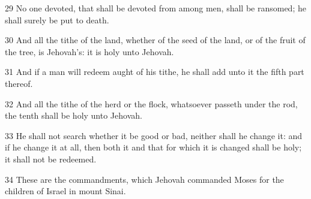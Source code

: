 \par 29 No one devoted, that shall be devoted from among men, shall be ransomed; he shall surely be put to death.
\par 30 And all the tithe of the land, whether of the seed of the land, or of the fruit of the tree, is Jehovah's: it is holy unto Jehovah.
\par 31 And if a man will redeem aught of his tithe, he shall add unto it the fifth part thereof.
\par 32 And all the tithe of the herd or the flock, whatsoever passeth under the rod, the tenth shall be holy unto Jehovah.
\par 33 He shall not search whether it be good or bad, neither shall he change it: and if he change it at all, then both it and that for which it is changed shall be holy; it shall not be redeemed.
\par 34 These are the commandments, which Jehovah commanded Moses for the children of Israel in mount Sinai.

